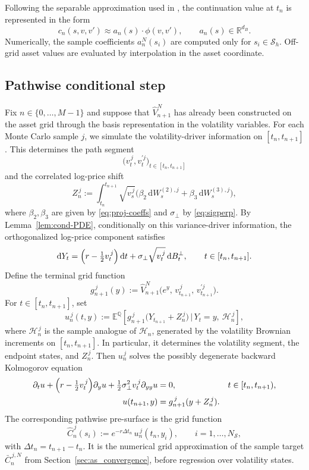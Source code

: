 \documentclass[pdflatex,sn-mathphys-num]{sn-jnl}
\theoremstyle{thmstyleone}%
\theoremstyle{thmstylethree}%
\theoremstyle{thmstyletwo}%
\newcommand{\dd}{\mathrm d}
\newcommand{\E}{\mathbb E}
\newcommand{\Q}{\mathbb Q}
\begin{document}
Following the separable approximation used in \cite{farahany2020mixing}, the continuation value at $t_n$ is represented in the form
\[
c_n(s,v,v')\approx a_n(s)\cdot \phi(v,v'),\qquad a_n(s)\in\mathbb R^{d_B}.
\]
Numerically, the sample coefficients $a_n^N(s_i)$ are computed only for $s_i\in\mathcal S_h$. Off-grid asset values are evaluated by interpolation in the asset coordinate.

\subsection{Pathwise conditional step}
Fix $n\in\{0,\dots,M-1\}$ and suppose that $\widehat V_{n+1}^N$ has already been constructed on the asset grid through the basis representation in the volatility variables. For each Monte Carlo sample $j$, we simulate the volatility-driver information on $[t_n,t_{n+1}]$. This determines the path segment
\[
\bigl(v_t^{\,j},v_t^{\prime j}\bigr)_{t\in[t_n,t_{n+1}]}
\]
and the correlated log-price shift
\[
Z_n^{\,j}
:=\int_{t_n}^{t_{n+1}} \sqrt{v_s^{\,j}}
\bigl(\beta_2\,\dd W_s^{(2),j}+\beta_3\,\dd W_s^{(3),j}\bigr),
\]
where $\beta_2,\beta_3$ are given by \eqref{eq:proj-coeffs} and $\sigma_\perp$ by \eqref{eq:sigperp}. By Lemma~\ref{lem:cond-PDE}, conditionally on this variance-driver information, the orthogonalized log-price component satisfies
\[
\dd Y_t = \Bigl(r-\tfrac12 v_t^{\,j}\Bigr)\,\dd t
+ \sigma_\perp\sqrt{v_t^{\,j}}\,\dd B_t^\perp,
\qquad t\in[t_n,t_{n+1}].
\]
Define the terminal grid function
\[
g_{n+1}^{\,j}(y)
:=\widehat V_{n+1}^N\bigl(e^{y},\,v_{t_{n+1}}^{\,j},\,v_{t_{n+1}}^{\prime j}\bigr).
\]
For $t\in[t_n,t_{n+1}]$, set
\[
u_n^{\,j}(t,y)
:= \E^{\Q}\!\left[
g_{n+1}^{\,j}\bigl(Y_{t_{n+1}}+Z_n^{\,j}\bigr)
\,\big|\,Y_t=y,\ \mathcal H_n^{\,j}
\right],
\]
where $\mathcal H_n^{\,j}$ is the sample analogue of $\mathcal H_n$, generated by the volatility Brownian increments on $[t_n,t_{n+1}]$. In particular, it determines the volatility segment, the endpoint states, and $Z_n^{\,j}$. Then $u_n^{\,j}$ solves the possibly degenerate backward Kolmogorov equation
\begin{equation}
\begin{aligned}
\partial_t u
+ \Bigl(r-\tfrac12 v_t^{\,j}\Bigr)\partial_y u
+ \tfrac12\sigma_\perp^2 v_t^{\,j}\partial_{yy}u &=0,
&& t\in[t_n,t_{n+1}),\\
u(t_{n+1},y) &= g_{n+1}^{\,j}(y+Z_n^{\,j}).
\end{aligned}
\label{eq:pathwise-pde}
\end{equation}
The corresponding pathwise pre-surface is the grid function
\[
\widehat C_n^{\,j}(s_i)
:= e^{-r\Delta t_n}\,u_n^{\,j}(t_n,y_i),
\qquad i=1,\dots,N_{\mathcal S},
\]
with $\Delta t_n=t_{n+1}-t_n$. It is the numerical grid approximation of the sample target $\bar C_n^{\,j,N}$ from Section~\ref{sec:as_convergence}, before regression over volatility states.
\end{document}
